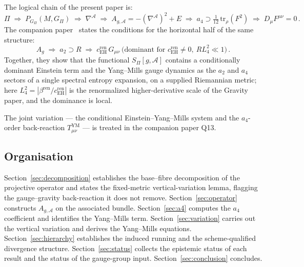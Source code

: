 \documentclass[12pt,a4paper]{article}
\theoremstyle{remark}
\theoremstyle{plain}
\theoremstyle{definition}
\begin{document}
      The logical chain of the present paper is:
      \[
        \Pi
        \;\Rightarrow\;
        P_{G_\Pi}(M, G_\Pi)
        \;\Rightarrow\;
        \nabla^{\mathcal{A}}
        \;\Rightarrow\;
        A_{g,\mathcal{A}}
        = -(\nabla^{\mathcal{A}})^2 + E
        \;\Rightarrow\;
        a_4 \supset \tfrac{1}{12}\,
        \mathrm{tr}_\rho(F^2)
        \;\Rightarrow\;
        D_\mu F^{\mu\nu} = 0\,.
      \]
      The companion paper~\cite{Beau2026h} states the conditions for the horizontal
      half of the same structure:
      \[
        A_g
        \;\Rightarrow\;
        a_2 \supset R
        \;\Rightarrow\;
        c_{\mathrm{EH}}^{\mathrm{ren}}\, G_{\mu\nu}
        \ \text{(dominant for } c_{\mathrm{EH}}^{\mathrm{ren}} \neq 0,\ R L_4^2 \ll 1)\,.
      \]
      Together, they show that the functional $S_\Pi[g,\mathcal{A}]$
      contains a conditionally dominant Einstein term and the Yang--Mills gauge dynamics as the
      $a_2$ and $a_4$ sectors of a single spectral entropy expansion, on a supplied Riemannian metric; here
      $L_4^2 = |\beta^{\mathrm{ren}}/c_{\mathrm{EH}}^{\mathrm{ren}}|$ is the renormalized higher-derivative scale of
      the Gravity paper, and the dominance is local.

      The joint variation --- the conditional Einstein--Yang--Mills system and the $a_4$-order
      back-reaction $T^{\mathrm{YM}}_{\mu\nu}$ --- is treated in the companion paper Q13.

    \subsection{Organisation}
      \label{subsec:organisation}

      Section~\ref{sec:decomposition} establishes the base--fibre
      decomposition of the projective operator and states the
      fixed-metric vertical-variation lemma, flagging the
      gauge--gravity back-reaction it does not remove.
      Section~\ref{sec:operator} constructs $A_{g,\mathcal{A}}$ on
      the associated bundle.
      Section~\ref{sec:a4} computes the $a_4$ coefficient and
      identifies the Yang--Mills term.
      Section~\ref{sec:variation} carries out the vertical variation
      and derives the Yang--Mills equations.
      Section~\ref{sec:hierarchy} establishes the induced running and the scheme-qualified
      divergence structure.
      Section~\ref{sec:status} collects the epistemic status of each
      result and the status of the gauge-group input.
      Section~\ref{sec:conclusion} concludes.
\end{document}
